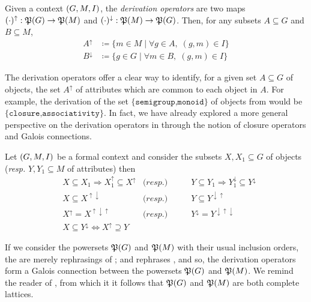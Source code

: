\begin{definition}
     \label{definition:derivation-operators} 
  Given a context $(G,M,\mathrel{I})$, the \textit{derivation operators} are two maps $(\cdot)^\uparrow : \mathfrak{P}({G}) \to \mathfrak{P}({M})$ and $(\cdot)^\downarrow : \mathfrak{P}({M}) \to \mathfrak{P}({G})$. Then, for any subsets $A \subseteq G$ and $B \subseteq M$,
  \begin{align*}
       A^\uparrow & \coloneqq \{m \in M \mid \forall g \in A, \; (g,m) \in I\} \\
       B^\downarrow & \coloneqq \{g \in G \mid \forall m \in B, \; (g,m) \in I\}
  \end{align*}
\end{definition}

The derivation operators offer a clear way to identify, for a given set $A \subseteq G$ of objects, the set $A^\uparrow$ of attributes which are common to each object in $A$. For example, the derivation of the set $\{\texttt{semigroup,monoid}\}$ of objects from  would be $\{\texttt{closure,associativity}\}$. In fact, we have already explored a more general perspective on the derivation operators in  through the notion of closure operators and Galois connections.

\begin{proposition}
\label{proposition:derivation-operators-galois}
Let $(G,M,\mathrel{I})$ be a formal context and consider the subsets $X,X_1 \subseteq G$ of objects (\textit{resp.} $Y,Y_1 \subseteq M$ of attributes) then
\begin{align}
    & X \subseteq X_1 \Rightarrow X_1^\uparrow \subseteq X^\uparrow & \textit{(resp.)} & \qquad Y \subseteq Y_1 \Rightarrow Y_1^\downarrow \subseteq Y^\downarrow \label{equation:galois-1} \\
    & X \subseteq X^{\uparrow \downarrow} & \textit{(resp.)} & \qquad Y \subseteq Y^{\downarrow \uparrow} \label{equation:galois-2} \\
    & X^\uparrow = X^{\uparrow \downarrow \uparrow}  & \textit{(resp.)} & \qquad  Y^\downarrow = Y^{\downarrow \uparrow \downarrow} \label{equation:galois-3} \\
    & X \subseteq Y^\downarrow \Longleftrightarrow X^\uparrow \supseteq Y & \label{equation:galois-4}
\end{align}
\end{proposition}

If we consider the powersets $\mathfrak{P}({G})$ and $\mathfrak{P}({M})$ with their usual inclusion orders, the  are merely rephrasings of ; and  rephrases , and so, the derivation operators form a Galois connection between the powersets $\mathfrak{P}({G})$ and $\mathfrak{P}({M})$. We remind the reader of , from which it it follows that $\mathfrak{P}({G})$ and $\mathfrak{P}({M})$ are both complete lattices.

